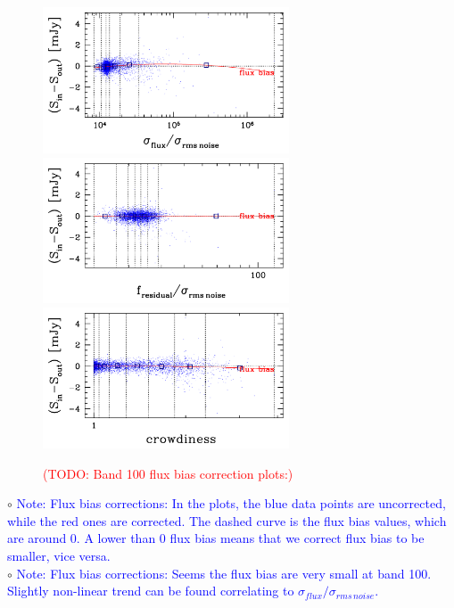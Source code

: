 \documentclass[11pt,a4paper]{article}
\begin{document}
\begin{figure}[H]
	\caption{
		\textcolor{red}{(TODO: Band 100 flux bias correction plots:)}
	}
	\includegraphics[width=0.65\textwidth]{galsim_100_fbias_1}
	\includegraphics[width=0.65\textwidth]{galsim_100_fbias_2}
	\includegraphics[width=0.65\textwidth]{galsim_100_fbias_3}
\end{figure}

\indent\hspace{15pt}$\circ$ 
\textcolor{blue}{Note: Flux bias corrections: In the plots, the blue data points are uncorrected, while the red ones are corrected. The dashed curve is the flux bias values, which are around 0. A lower than 0 flux bias means that we correct flux bias to be smaller, vice versa. }
\\
\indent\hspace{15pt}$\circ$ 
\textcolor{blue}{Note: Flux bias corrections: Seems the flux bias are very small at band 100. Slightly non-linear trend can be found correlating to $\sigma_{flux}/\sigma_{rms\,noise}$. }
\\
\end{document}

